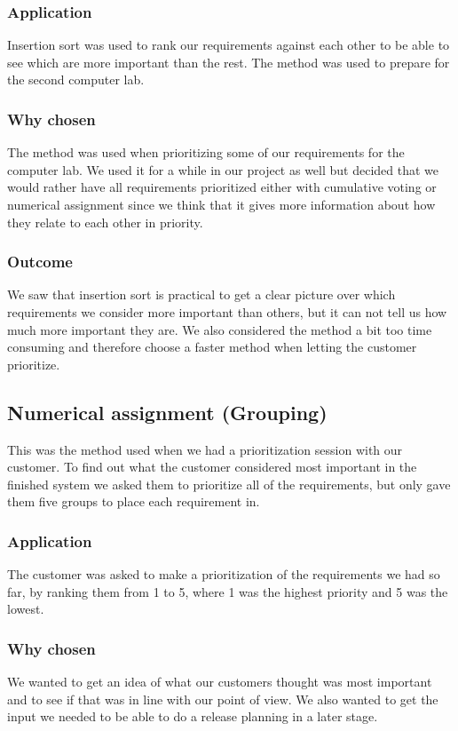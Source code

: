 \documentclass[a4paper]{article}
\begin{document}
		\subsubsection{Application}
			Insertion sort was used to rank our requirements against each other to be able to see which are more important than the rest. The method was used to prepare for the second computer lab.
		\subsubsection{Why chosen}
			The method was used when prioritizing some of our requirements for the computer lab. We used it for a while in our project as well but decided that we would rather have all requirements prioritized either with cumulative voting or numerical assignment since we think that it gives more information about how they relate to each other in priority.
		\subsubsection{Outcome}
			We saw that insertion sort is practical to get a clear picture over which requirements we consider more important than others, but it can not tell us how much more important they are. We also considered the method a bit too time consuming and therefore choose a faster method when letting the customer prioritize.  			
		
	\subsection{Numerical assignment (Grouping)}
		This was the method used when we had a prioritization session with our customer.
		To find out what the customer considered most important in the finished system we asked them to prioritize all of the requirements, but only gave them five groups to place each requirement in.
		\subsubsection{Application}
			The customer was asked to make a prioritization of the requirements we had so far, by ranking them from 1 to 5, where 1 was the highest priority and 5 was the lowest.
		\subsubsection{Why chosen}
			We wanted to get an idea of what our customers thought was most important and to see if that was in line with our point of view. We also wanted to get the input we needed to be able to do a release planning in a later stage.
\end{document}
